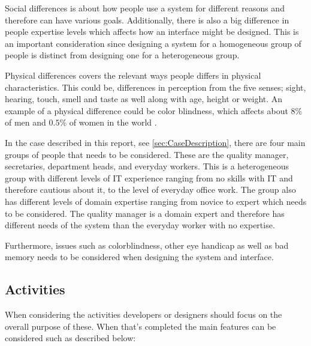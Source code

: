 Social differences is about how people use a system for different reasons and therefore can have various goals.
Additionally, there is also a big difference in people expertise levels which affects how an interface might be designed.
This is an important consideration since designing a system for a homogeneous group of people is  distinct from designing one for a heterogeneous group. \citep{Benyon}

Physical differences covers the relevant ways people differs in physical characteristics.
This could be, differences in perception from the five senses; sight, hearing, touch, smell and taste as well along with age, height or weight.
An example of a physical difference could be color blindness, which affects about $8\%$ of men and $0.5\%$ of women in the world \cite{ColourBlind}.

In the case described in this report, see \cref{sec:CaseDescription}, there are four main groups of people that needs to be considered.
These are the quality manager, secretaries, department heads, and everyday workers.
This is a heterogeneous group with different levels of IT experience ranging from no skills with IT and therefore cautious about it, to the level of everyday office work.
The group also has different levels of domain expertise ranging from novice to expert which needs to be considered.
The quality manager is a domain expert and therefore has different needs of the system than the everyday worker with no expertise.

Furthermore, issues such as colorblindness, other eye handicap as well as bad memory needs to be considered when designing the system and interface.

\subsection{Activities}\label{PACT-actvities}
When considering the activities developers or designers should focus on the overall purpose of these.
When that's completed the main features can be considered such as described below:

